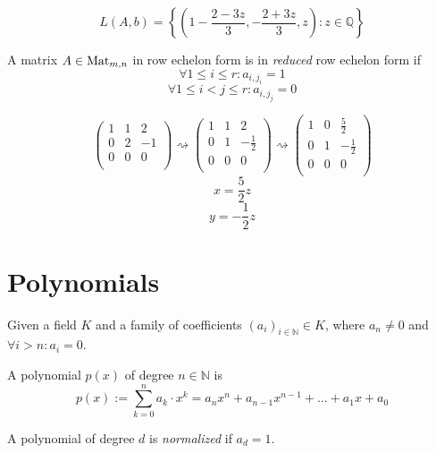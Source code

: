 \begin{example}
   \[L(A, b) = \left\{\left(1 - \frac{2 - 3z}{3}, -\frac{2 + 3z}{3}, z\right): z \in \mathbb{Q}\right\}\]
\end{example}

\begin{definition}
   A matrix \(A \in \operatorname{Mat}_{m,n}\) in row echelon form is in \textit{reduced} row echelon form if
   \[\forall 1 \leq i \leq r: a_{i, j_i} = 1\]
   \[\forall 1 \leq i < j \leq r: a_{i, j_j} = 0\]
\end{definition}
\begin{example}
   \[\begin{pmatrix}
         1 & 1 &  2 \\
         0 & 2 & -1 \\
         0 & 0 & 0 \\
      \end{pmatrix} \rightsquigarrow \begin{pmatrix}
         1 & 1 &  2 \\
         0 & 1 & -\frac{1}{2} \\
         0 & 0 & 0 \\
      \end{pmatrix} \rightsquigarrow \begin{pmatrix}
         1 & 0 &  \frac{5}{2} \\
         0 & 1 & -\frac{1}{2} \\
         0 & 0 & 0 \\
      \end{pmatrix}
   \]
   \[x = \frac{5}{2}z\]
   \[y = -\frac{1}{2}z\]
\end{example}

\newpage

\section{Polynomials}
\begin{definition}[Polynomial]
   Given a field \(K\) and a family of coefficients \((a_i)_{i \in \mathbb{N}} \in K\), where \(a_n \neq 0\) and \(\forall i > n: a_i = 0\).

   A polynomial \(p(x)\) of degree \(n \in \mathbb{N}\) is
   \[p(x) := \sum_{k=0}^n a_k \cdot x^k = a_nx^n + a_{n-1}x^{n-1} + \ldots + a_1x + a_0\]
\end{definition}
\begin{remark}
   A polynomial of degree \(d\) is \textit{normalized} if \(a_d = 1\).
\end{remark}

